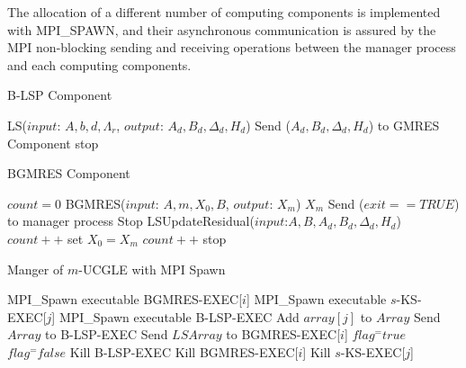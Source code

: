 The allocation of a different number of computing components is implemented with MPI\_SPAWN, and their asynchronous communication is assured by the MPI non-blocking sending and receiving operations between the manager process and each computing components.

\begin{algorithm}[h]
	\label{blspc}
	\caption{B-LSP Component}   
	\begin{algorithmic}[1]
		\State LS{($input$: $A,b,d,\Lambda_r$, $output$: $A_d, B_d, \Delta_d, H_d$)}
		\State Send ($A_d, B_d, \Delta_d, H_d$) to GMRES Component
		\EndIf
		\State stop \EndIf
		\EndFunction
		
	\end{algorithmic}  
\end{algorithm}

\begin{algorithm}[h]
	\label{bgmresc}
	\caption{BGMRES Component}   
	\begin{algorithmic}[1]
		\State $count=0$
		\State BGMRES{($input$: $A, m, X_0,B$, $output$: $X_m$)}
		\State \Return $X_m$
		\State Send ($exit==TRUE$) to manager process
		\State Stop
		\Else {}
		\State LSUpdateResidual($input$:$A, B, A_d, B_d, \Delta_d, H_d$)
		\State $count++$
		\EndIf
		\Else
		\State set $X_0=X_m$
		\State $count++$
		\EndIf
		\EndIf
		\State stop \EndIf
		\EndFunction
	\end{algorithmic}  
\end{algorithm}

\begin{algorithm}[htbp]
	\caption{Manger of $m$-UCGLE with MPI Spawn}   
	\label{alg:ucmgle}   
	\begin{algorithmic}[1]
		\State MPI\_Spawn executable BGMRES-EXEC[$i$]
		\EndFor
		\State MPI\_Spawn executable $s$-KS-EXEC[$j$]
		\EndFor
		\State MPI\_Spawn executable B-LSP-EXEC
		\State Add $array[j]$ to $Array$
		\EndIf
		\EndFor
		\State Send $Array$ to B-LSP-EXEC
		\EndIf
		\State Send $LSArray$ to BGMRES-EXEC[$i$]
		\EndFor
		\EndIf
		\State $flag ^= true$
		\Else
		\State $flag ^= false$
		\EndIf
		\EndIf
		\EndFor
		\State Kill B-LSP-EXEC
		\State Kill BGMRES-EXEC[$i$]
		\EndFor
		\State Kill $s$-KS-EXEC[$j$]
		\EndFor
		\EndIf
		\EndFunction
		
	\end{algorithmic}  
\end{algorithm}


